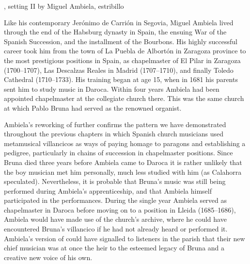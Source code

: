 {, setting II by Miguel Ambiela, estribillo}

Like his contemporary Jerónimo de Carrión in Segovia, Miguel Ambiela lived
through the end of the Habsburg dynasty in Spain, the ensuing War of the
Spanish Succession, and the installment of the Bourbons.
His highly successful career took him from the town of La Puebla de Albortón in
Zaragoza province to the most prestigious positions in Spain, as chapelmaster
of El Pilar in Zaragoza (1700--1707), Las Descalzas Reales in Madrid
(1707--1710), and finally Toledo Cathedral (1710--1733).%
    \Autocites
    [1]{Calahorra:Suban}
    []{Grove}
    {Alvarez:Ambiela}
His training began at age 15, when in 1681 his parents sent him to study music
in Daroca.
Within four years Ambiela had been appointed chapelmaster at the collegiate
church there.
This was the same church at which Pablo Bruna had served as the renowned
organist.

Ambiela's reworking of  further confirms the pattern we
have demonstrated throughout the previous chapters in which Spanish church
musicians used metamusical villancicos as ways of paying homage to paragons and
establishing a pedigree, particularly in chains of succession in chapelmaster
positions.
Since Bruna died three years before Ambiela came to Daroca it is rather
unlikely that the boy musician met him personally, much less studied with him
(as Calahorra speculated).%
    \Autocite{Calahorra:Suban}
Nevertheless, it is probable that Bruna's music was still being performed
during Ambiela's apprenticeship, and that Ambiela himself participated in the
performances.  
During the single year Ambiela served as chapelmaster in Daroca before moving
on to a position in Lleida (1685--1686), Ambiela would have made use of the
church's archive, where he could have encountered Bruna's villancico if he had
not already heard or performed it.
Ambiela's version of  could have signalled to listeners
in the parish that their new chief musician was at once the heir to the
esteemed legacy of Bruna and a creative new voice of his own.

